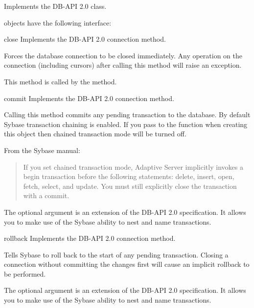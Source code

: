 Implements the DB-API 2.0  class.

 objects have the following interface:

\begin{methoddesc}[Connection]{close}{}
Implements the DB-API 2.0 connection  method.

Forces the database connection to be closed immediately.  Any
operation on the connection (including cursors) after calling this
method will raise an exception.

This method is called by the  method.
\end{methoddesc}

\begin{methoddesc}[Connection]{commit}{}
Implements the DB-API 2.0 connection  method.

Calling this method commits any pending transaction to the database.
By default Sybase transaction chaining is enabled.  If you pass
 to the  function when
creating this  object then chained transaction mode
will be turned off.

From the Sybase manual:
\begin{quote}
If you set chained transaction mode, Adaptive Server implicitly
invokes a begin transaction before the following statements: delete,
insert, open, fetch, select, and update. You must still explicitly
close the transaction with a commit.
\end{quote}

The optional  argument is an extension of the DB-API 2.0
specification.  It allows you to make use of the Sybase ability to
nest and name transactions.
\end{methoddesc}

\begin{methoddesc}[Connection]{rollback}{}
Implements the DB-API 2.0 connection  method.

Tells Sybase to roll back to the start of any pending transaction.
Closing a connection without committing the changes first will cause
an implicit rollback to be performed.

The optional  argument is an extension of the DB-API 2.0
specification.  It allows you to make use of the Sybase ability to
nest and name transactions.
\end{methoddesc}

